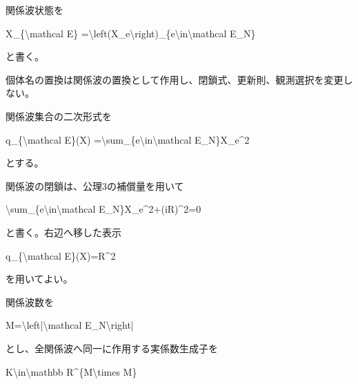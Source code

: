 \documentclass[
  a4paper,
]{ltjsarticle}
\newenvironment{Shaded}{}{}
\newcommand{\NormalTok}[1]{#1}
\begin{document}
関係波状態を

\begin{Shaded}
\begin{Highlighting}[]
\NormalTok{X\_\{\textbackslash{}mathcal E\}}
\NormalTok{=\textbackslash{}left(X\_e\textbackslash{}right)\_\{e\textbackslash{}in\textbackslash{}mathcal E\_N\}}
\end{Highlighting}
\end{Shaded}

と書く。

個体名の置換は関係波の置換として作用し、閉鎖式、更新則、観測選択を変更しない。

関係波集合の二次形式を

\begin{Shaded}
\begin{Highlighting}[]
\NormalTok{q\_\{\textbackslash{}mathcal E\}(X)}
\NormalTok{=\textbackslash{}sum\_\{e\textbackslash{}in\textbackslash{}mathcal E\_N\}X\_e\^{}2}
\end{Highlighting}
\end{Shaded}

とする。

関係波の閉鎖は、公理3の補償量を用いて

\begin{Shaded}
\begin{Highlighting}[]
\NormalTok{\textbackslash{}sum\_\{e\textbackslash{}in\textbackslash{}mathcal E\_N\}X\_e\^{}2+(iR)\^{}2=0}
\end{Highlighting}
\end{Shaded}

と書く。右辺へ移した表示

\begin{Shaded}
\begin{Highlighting}[]
\NormalTok{q\_\{\textbackslash{}mathcal E\}(X)=R\^{}2}
\end{Highlighting}
\end{Shaded}

を用いてよい。

関係波数を

\begin{Shaded}
\begin{Highlighting}[]
\NormalTok{M=\textbackslash{}left|\textbackslash{}mathcal E\_N\textbackslash{}right|}
\end{Highlighting}
\end{Shaded}

とし、全関係波へ同一に作用する実係数生成子を

\begin{Shaded}
\begin{Highlighting}[]
\NormalTok{K\textbackslash{}in\textbackslash{}mathbb R\^{}\{M\textbackslash{}times M\}}
\end{Highlighting}
\end{Shaded}
\end{document}
